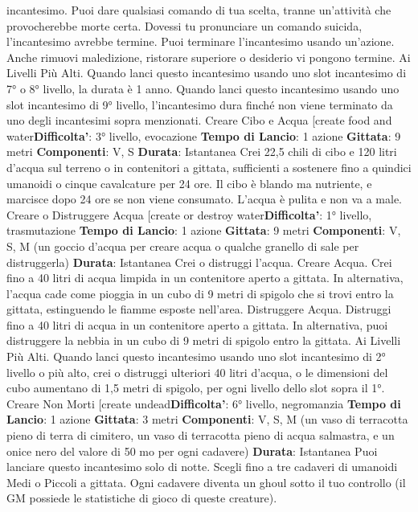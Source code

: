 \begin{multicols}{2}
incantesimo.
Puoi dare qualsiasi comando di tua scelta, tranne
un’attività che provocherebbe morte certa. Dovessi tu
pronunciare un comando suicida, l’incantesimo avrebbe
termine.
Puoi terminare l’incantesimo usando un’azione. Anche
rimuovi maledizione, ristorare superiore o desiderio vi
pongono termine.
Ai Livelli Più Alti. Quando lanci questo incantesimo
usando uno slot incantesimo di 7° o 8° livello, la durata
è 1 anno. Quando lanci questo incantesimo usando uno
slot incantesimo di 9° livello, l’incantesimo dura finché
non viene terminato da uno degli incantesimi sopra
menzionati.
Creare Cibo e Acqua
[create food and water\textbf{Difficolta'}:
3° livello, evocazione
\textbf{Tempo di Lancio}: 1 azione
\textbf{Gittata}: 9 metri
\textbf{Componenti}: V, S
\textbf{Durata}: Istantanea
Crei 22,5 chili di cibo e 120 litri d’acqua sul terreno o in
contenitori a gittata, sufficienti a sostenere fino a
quindici umanoidi o cinque cavalcature per 24 ore. Il
cibo è blando ma nutriente, e marcisce dopo 24 ore se
non viene consumato. L’acqua è pulita e non va a male.
Creare o Distruggere Acqua
[create or destroy water\textbf{Difficolta'}:
1° livello, trasmutazione
\textbf{Tempo di Lancio}: 1 azione
\textbf{Gittata}: 9 metri
\textbf{Componenti}: V, S, M (un goccio d’acqua per creare
acqua o qualche granello di sale per distruggerla)
\textbf{Durata}: Istantanea
Crei o distruggi l’acqua.
Creare Acqua. Crei fino a 40 litri di acqua limpida in un
contenitore aperto a gittata. In alternativa, l’acqua cade
come pioggia in un cubo di 9 metri di spigolo che si trovi
entro la gittata, estinguendo le fiamme esposte
nell’area.
Distruggere Acqua. Distruggi fino a 40 litri di acqua in
un contenitore aperto a gittata. In alternativa, puoi
distruggere la nebbia in un cubo di 9 metri di spigolo
entro la gittata.
Ai Livelli Più Alti. Quando lanci questo incantesimo
usando uno slot incantesimo di 2° livello o più alto, crei
o distruggi ulteriori 40 litri d’acqua, o le dimensioni del
cubo aumentano di 1,5 metri di spigolo, per ogni livello
dello slot sopra il 1°.
Creare Non Morti
[create undead\textbf{Difficolta'}:
6° livello, negromanzia
\textbf{Tempo di Lancio}: 1 azione
\textbf{Gittata}: 3 metri
\textbf{Componenti}: V, S, M (un vaso di terracotta pieno di
terra di cimitero, un vaso di terracotta pieno di acqua
salmastra, e un onice nero del valore di 50 mo per ogni
cadavere)
\textbf{Durata}: Istantanea
Puoi lanciare questo incantesimo solo di notte. Scegli
fino a tre cadaveri di umanoidi Medi o Piccoli a gittata.
Ogni cadavere diventa un ghoul sotto il tuo controllo (il
GM possiede le statistiche di gioco di queste creature).

\end{multicols}
